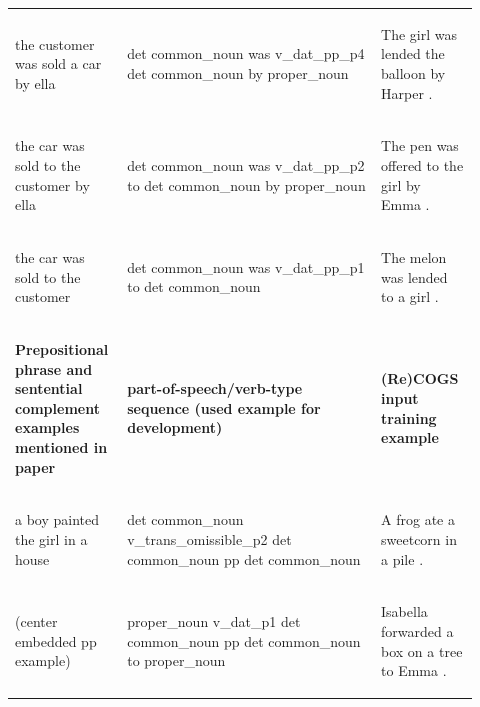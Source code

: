 \documentclass[11pt]{article}
\begin{document}
\begin{table}
\begin{tabular}{p{0.2\linewidth} p{0.52\linewidth} p{0.2\linewidth}}
\begin{small}the customer was sold a car by ella\end{small} & \begin{small}det common\_noun was v\_dat\_pp\_p4 det common\_noun by proper\_noun \end{small} & \begin{small}The girl was lended the balloon by Harper .\end{small} \\
\begin{small}the car was sold to the customer by ella\end{small} & \begin{small}det common\_noun was v\_dat\_pp\_p2 to det common\_noun by proper\_noun \end{small} & \begin{small}The pen was offered to the girl by Emma .\end{small} \\
\begin{small}the car was sold to the customer\end{small} & \begin{small}det common\_noun was v\_dat\_pp\_p1 to det common\_noun \end{small} & \begin{small}The melon was lended to a girl .\end{small} \\
\hline
\begin{small}\textbf{Prepositional phrase and sentential complement examples mentioned in paper}\end{small} & \begin{small}\textbf{part-of-speech/verb-type sequence (used example for development)}\end{small} & \begin{small}\textbf{(Re)COGS input training example}\end{small} \\
\hline
\begin{small}a boy painted the girl in a house\end{small} & \begin{small}det common\_noun v\_trans\_omissible\_p2 det common\_noun pp det common\_noun\end{small} & \begin{small}A frog ate a sweetcorn in a pile .\end{small} \\
\begin{small}(center embedded pp example)\end{small} & \begin{small}proper\_noun v\_dat\_p1 det common\_noun pp det common\_noun to proper\_noun\end{small} & \begin{small}Isabella forwarded a box on a tree to Emma .\end{small} \\

\end{tabular}
\end{table}
\end{document}
